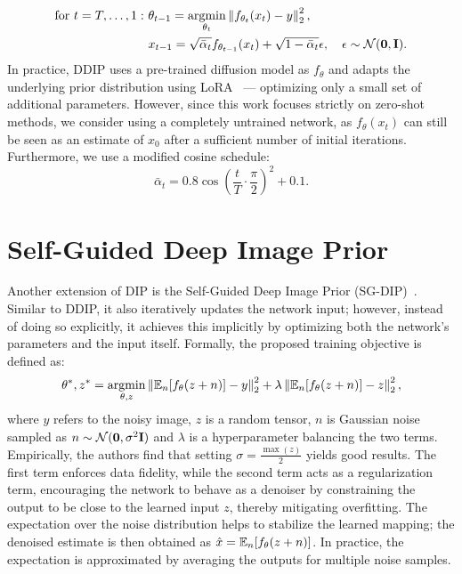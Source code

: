 \begin{align}
    \text{for}\ t=T,\dots,1:\ &\theta_{t-1} = \argmin_{\theta_t} \norm{f_{\theta_t}(x_t) - y}_2^2,\\
    &x_{t-1} = \sqrt{\bar{\alpha}_t}f_{\theta_{t-1}}(x_t) + \sqrt{1-\bar{\alpha}_t}\epsilon, \quad \epsilon \sim \unormal.
\end{align}
In practice, DDIP uses a pre-trained diffusion model as $f_\theta$ and adapts the underlying prior distribution using LoRA~\cite{LoRA} --- optimizing only a small set of additional parameters.
However, since this work focuses strictly on zero-shot methods, we consider using a completely untrained network, as $f_\theta(x_t)$ can still be seen as an estimate of $x_0$ after a sufficient number of initial iterations.
Furthermore, we use a modified cosine schedule: 
\begin{equation}
    \bar{\alpha}_t = 0.8\cos\left(\frac{t}{T}\cdot\frac{\pi}{2}\right)^2+0.1.
\end{equation}

\section{Self-Guided Deep Image Prior}

Another extension of DIP is the Self-Guided Deep Image Prior (SG-DIP)~\cite{SG-DIP}.
Similar to DDIP, it also iteratively updates the network input; however, instead of doing so explicitly, it achieves this implicitly by optimizing both the network's parameters and the input itself.
Formally, the proposed training objective is defined as:
\begin{equation}
    \theta^*,z^* = \argmin_{\theta, z} \norm{\E[n]{f_\theta(z + n)} - y}_2^2 + \lambda\norm{\E[n]{f_\theta(z + n)} - z}_2^2,
\end{equation}
where $y$ refers to the noisy image, $z$ is a random tensor, $n$ is Gaussian noise sampled as $n \sim \normal$ and $\lambda$ is a hyperparameter balancing the two terms.
Empirically, the authors find that setting $\sigma = \frac{\max(z)}{2}$ yields good results.
The first term enforces data fidelity, while the second term acts as a regularization term, encouraging the network to behave as a denoiser by constraining the output to be close to the learned input $z$, thereby mitigating overfitting. 
The expectation over the noise distribution helps to stabilize the learned mapping; the denoised estimate is then obtained as $\hat{x} = \E[n]{f_\theta(z + n)}$.
In practice, the expectation is approximated by averaging the outputs for multiple noise samples.

